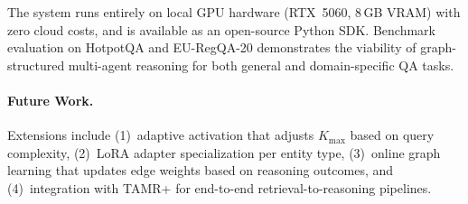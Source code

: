 \documentclass[a4paper,11pt]{article}
\theoremstyle{definition}
\begin{document}
The system runs entirely on local GPU hardware (RTX~5060, 8\,GB VRAM) with zero cloud costs, and is available as an open-source Python SDK.
Benchmark evaluation on HotpotQA and EU-RegQA-20 demonstrates the viability of graph-structured multi-agent reasoning for both general and domain-specific QA tasks.

\paragraph{Future Work.}
Extensions include (1)~adaptive activation that adjusts $K_{\max}$ based on query complexity, (2)~LoRA adapter specialization per entity type, (3)~online graph learning that updates edge weights based on reasoning outcomes, and (4)~integration with TAMR+ for end-to-end retrieval-to-reasoning pipelines.

\end{document}
